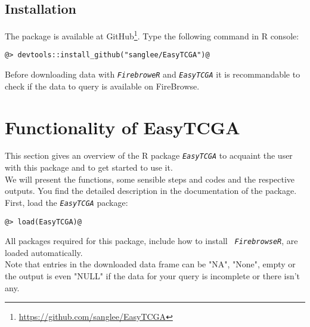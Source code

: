 \documentclass{TechReport}
\begin{document}
\subsection{Installation}
The package is available at
GitHub\footnote{\url{https://github.com/sanglee/EasyTCGA}}. Type the following
command in R console:
\begin{lstlisting}[style=base]
@> devtools::install_github("sanglee/EasyTCGA")@
\end{lstlisting}
Before downloading data with \texttt{\em FirebroweR} and \texttt{\em EasyTCGA} it is
recommandable to check if the data to query is available 
on FireBrowse\footnotemark[4].\\

\section{Functionality of EasyTCGA}
This section gives an overview of the R package \texttt{\em EasyTCGA} to acquaint
the user with this package and to get started to use it.\\
We will present the functions, some sensible steps and codes and the respective
outputs. You find the detailed description in the
documentation of the package.\\
First, load the \texttt{\em EasyTCGA} package:
\begin{lstlisting}[style=base]
@> load(EasyTCGA)@
\end{lstlisting}
All packages required for this package, include how to install \texttt{\em
FirebrowseR}, are loaded automatically.\\
Note that entries in the downloaded data frame can be "NA", "None", empty or the output is even
"NULL" if the data for your query is incomplete or there isn't any.\\
\end{document}
